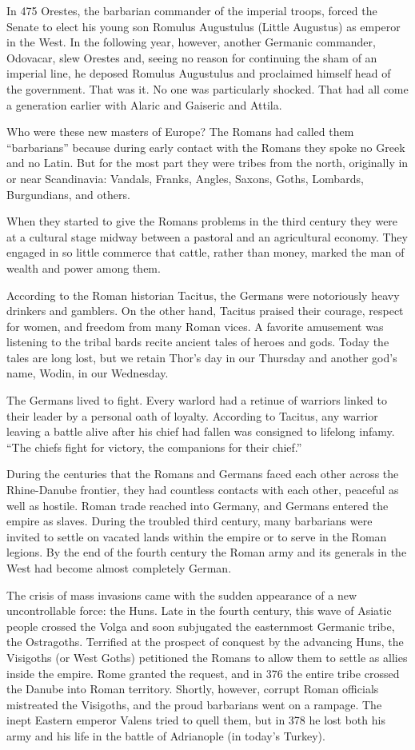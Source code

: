 In 475 Orestes, the barbarian commander of the imperial troops, forced the Senate to elect his young
son Romulus Augustulus (Little Augustus) as emperor in the West. In the following year, however,
another Germanic commander, Odovacar, slew Orestes and, seeing no reason for continuing the sham of
an imperial line, he deposed Romulus Augustulus and proclaimed himself head of the government. That
was it. No one was particularly shocked. That had all come a generation earlier with Alaric and
Gaiseric and Attila.

Who were these new masters of Europe? The Romans had called them “barbarians” because during early
contact with the Romans they spoke no Greek and no Latin. But for the most part they were tribes
from the north, originally in or near Scandinavia: Vandals, Franks, Angles, Saxons, Goths, Lombards,
Burgundians, and others.

When they started to give the Romans problems in the third century they were at a cultural stage
midway between a pastoral and an agricultural economy. They engaged in so little commerce that
cattle, rather than money, marked the man of wealth and power among them.

According to the Roman historian Tacitus, the Germans were notoriously heavy drinkers and gamblers.
On the other hand, Tacitus praised their courage, respect for women, and freedom from many Roman
vices. A favorite amusement was listening to the tribal bards recite ancient tales of heroes and
gods. Today the tales are long lost, but we retain Thor’s day in our Thursday and another god’s
name, Wodin, in our Wednesday.

The Germans lived to fight. Every warlord had a retinue of warriors linked to their leader by a
personal oath of loyalty. According to Tacitus, any warrior leaving a battle alive after his chief
had fallen was consigned to lifelong infamy. “The chiefs fight for victory, the companions for their
chief.”

During the centuries that the Romans and Germans faced each other across the Rhine-Danube frontier,
they had countless contacts with each other, peaceful as well as hostile. Roman trade reached into
Germany, and Germans entered the empire as slaves. During the troubled third century, many
barbarians were invited to settle on vacated lands within the empire or to serve in the Roman
legions. By the end of the fourth century the Roman army and its generals in the West had become
almost completely German.

The crisis of mass invasions came with the sudden appearance of a new uncontrollable force: the
Huns. Late in the fourth century, this wave of Asiatic people crossed the Volga and soon subjugated
the easternmost Germanic tribe, the Ostragoths. Terrified at the prospect of conquest by the
advancing Huns, the Visigoths (or West Goths) petitioned the Romans to allow them to settle as
allies inside the empire. Rome granted the request, and in 376 the entire tribe crossed the Danube
into Roman territory. Shortly, however, corrupt Roman officials mistreated the Visigoths, and the
proud barbarians went on a rampage. The inept Eastern emperor Valens tried to quell them, but in 378
he lost both his army and his life in the battle of Adrianople (in today’s Turkey).

